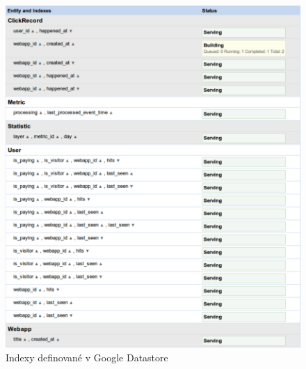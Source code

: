 \documentclass[bc,male,java,dept456]{diploma}						%
\begin{document}
\begin{figure}[h]
	\centering
	\includegraphics[width=15cm]{img/datastore_indexes.pdf}
	\caption{Indexy definované v Google Datastore}
	\label{img:datastore_indexes}
\end{figure}
\end{document}
